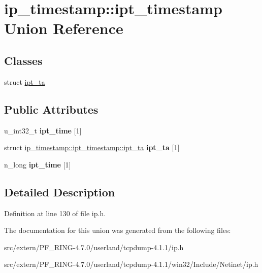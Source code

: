 \hypertarget{unionip__timestamp_1_1ipt__timestamp}{
\section{ip\_\-timestamp::ipt\_\-timestamp Union Reference}
\label{unionip__timestamp_1_1ipt__timestamp}
}
\subsection*{Classes}
\begin{DoxyCompactItemize}
\item 
struct \hyperlink{structip__timestamp_1_1ipt__timestamp_1_1ipt__ta}{ipt\_\-ta}
\end{DoxyCompactItemize}
\subsection*{Public Attributes}
\begin{DoxyCompactItemize}
\item 
\hypertarget{unionip__timestamp_1_1ipt__timestamp_a57cda9c4f88f8f8bafd099c170506d65}{
u\_\-int32\_\-t {\bfseries ipt\_\-time} \mbox{[}1\mbox{]}}
\label{unionip__timestamp_1_1ipt__timestamp_a57cda9c4f88f8f8bafd099c170506d65}

\item 
\hypertarget{unionip__timestamp_1_1ipt__timestamp_ad7cd05276f2538c57257ee3878aa7b18}{
struct \hyperlink{structip__timestamp_1_1ipt__timestamp_1_1ipt__ta}{ip\_\-timestamp::ipt\_\-timestamp::ipt\_\-ta} {\bfseries ipt\_\-ta} \mbox{[}1\mbox{]}}
\label{unionip__timestamp_1_1ipt__timestamp_ad7cd05276f2538c57257ee3878aa7b18}

\item 
\hypertarget{unionip__timestamp_1_1ipt__timestamp_a49ffe32d1958eb5fcf88cc03569effc9}{
n\_\-long {\bfseries ipt\_\-time} \mbox{[}1\mbox{]}}
\label{unionip__timestamp_1_1ipt__timestamp_a49ffe32d1958eb5fcf88cc03569effc9}

\end{DoxyCompactItemize}


\subsection{Detailed Description}


Definition at line 130 of file ip.h.



The documentation for this union was generated from the following files:\begin{DoxyCompactItemize}
\item 
src/extern/PF\_\-RING-\/4.7.0/userland/tcpdump-\/4.1.1/ip.h\item 
src/extern/PF\_\-RING-\/4.7.0/userland/tcpdump-\/4.1.1/win32/Include/Netinet/ip.h\end{DoxyCompactItemize}
